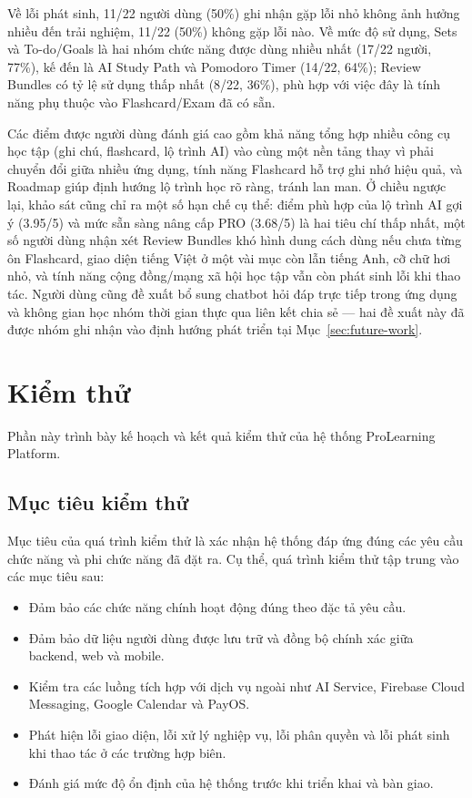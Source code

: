 Về lỗi phát sinh, 11/22 người dùng (50\%) ghi nhận gặp lỗi nhỏ không ảnh hưởng nhiều đến trải nghiệm, 11/22 (50\%) không gặp lỗi nào. Về mức độ sử dụng, Sets và To-do/Goals là hai nhóm chức năng được dùng nhiều nhất (17/22 người, 77\%), kế đến là AI Study Path và Pomodoro Timer (14/22, 64\%); Review Bundles có tỷ lệ sử dụng thấp nhất (8/22, 36\%), phù hợp với việc đây là tính năng phụ thuộc vào Flashcard/Exam đã có sẵn.

Các điểm được người dùng đánh giá cao gồm khả năng tổng hợp nhiều công cụ học tập (ghi chú, flashcard, lộ trình AI) vào cùng một nền tảng thay vì phải chuyển đổi giữa nhiều ứng dụng, tính năng Flashcard hỗ trợ ghi nhớ hiệu quả, và Roadmap giúp định hướng lộ trình học rõ ràng, tránh lan man. Ở chiều ngược lại, khảo sát cũng chỉ ra một số hạn chế cụ thể: điểm phù hợp của lộ trình AI gợi ý (3.95/5) và mức sẵn sàng nâng cấp PRO (3.68/5) là hai tiêu chí thấp nhất, một số người dùng nhận xét Review Bundles khó hình dung cách dùng nếu chưa từng ôn Flashcard, giao diện tiếng Việt ở một vài mục còn lẫn tiếng Anh, cỡ chữ hơi nhỏ, và tính năng cộng đồng/mạng xã hội học tập vẫn còn phát sinh lỗi khi thao tác. Người dùng cũng đề xuất bổ sung chatbot hỏi đáp trực tiếp trong ứng dụng và không gian học nhóm thời gian thực qua liên kết chia sẻ — hai đề xuất này đã được nhóm ghi nhận vào định hướng phát triển tại Mục~\ref{sec:future-work}.

\section{Kiểm thử}
\label{sec:testing}

Phần này trình bày kế hoạch và kết quả kiểm thử của hệ thống ProLearning Platform.

\subsection{Mục tiêu kiểm thử}

Mục tiêu của quá trình kiểm thử là xác nhận hệ thống đáp ứng đúng các yêu cầu chức năng và phi chức năng đã đặt ra. Cụ thể, quá trình kiểm thử tập trung vào các mục tiêu sau:

\begin{itemize}
    \item Đảm bảo các chức năng chính hoạt động đúng theo đặc tả yêu cầu.
    \item Đảm bảo dữ liệu người dùng được lưu trữ và đồng bộ chính xác giữa backend, web và mobile.
    \item Kiểm tra các luồng tích hợp với dịch vụ ngoài như AI Service, Firebase Cloud Messaging, Google Calendar và PayOS.
    \item Phát hiện lỗi giao diện, lỗi xử lý nghiệp vụ, lỗi phân quyền và lỗi phát sinh khi thao tác ở các trường hợp biên.
    \item Đánh giá mức độ ổn định của hệ thống trước khi triển khai và bàn giao.
\end{itemize}

